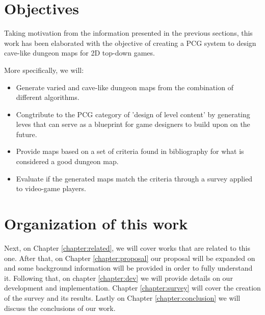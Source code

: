 \section{Objectives}
\label{sec:objectives}

Taking motivation from the information presented in the previous sections, this work has been elaborated with the objective of creating a PCG system to design cave-like dungeon maps for 2D top-down games.

More specifically, we will:

\begin{itemize}
\item \textbf{} Generate varied and cave-like dungeon maps from the combination of different algorithms.

\item \textbf{} Congtribute to the PCG category of 'design of level content' by generating leves that can serve as a blueprint for game designers to build upon on the future.

\item \textbf{} Provide maps based on a set of criteria found in bibliography for what is considered a good dungeon map.

\item \textbf{} Evaluate if the generated maps match the criteria through a survey applied to video-game players.

\end{itemize}

\section{Organization of this work}

Next, on Chapter \ref{chapter:related}, we will cover works that are related to this one. After that, on Chapter \ref{chapter:proposal} our proposal will be expanded on and some background information will be provided in order to fully understand it. Following that, on chapter \ref{chapter:dev} we will provide details on our development and implementation. Chapter \ref{chapter:survey} will cover the creation of the survey and its results. Lastly on Chapter \ref{chapter:conclusion} we will discuss the conclusions of our work.

